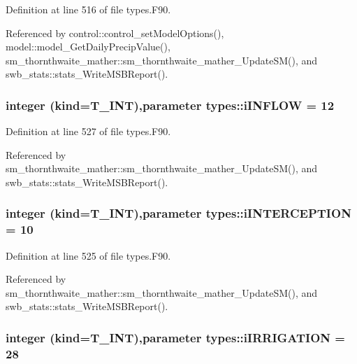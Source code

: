 Definition at line 516 of file types.F90.



Referenced by control::control\_\-setModelOptions(), model::model\_\-GetDailyPrecipValue(), sm\_\-thornthwaite\_\-mather::sm\_\-thornthwaite\_\-mather\_\-UpdateSM(), and swb\_\-stats::stats\_\-WriteMSBReport().

\hypertarget{namespacetypes_a76a571421076f0030f2ecf4ab852504d}{
\subsubsection[{iINFLOW}]{\setlength{\rightskip}{0pt plus 5cm}integer (kind={\bf T\_\-INT}),parameter {\bf types::iINFLOW} = 12}}
\label{namespacetypes_a76a571421076f0030f2ecf4ab852504d}


Definition at line 527 of file types.F90.



Referenced by sm\_\-thornthwaite\_\-mather::sm\_\-thornthwaite\_\-mather\_\-UpdateSM(), and swb\_\-stats::stats\_\-WriteMSBReport().

\hypertarget{namespacetypes_abbe2d030deced65481aa7f6447173269}{
\subsubsection[{iINTERCEPTION}]{\setlength{\rightskip}{0pt plus 5cm}integer (kind={\bf T\_\-INT}),parameter {\bf types::iINTERCEPTION} = 10}}
\label{namespacetypes_abbe2d030deced65481aa7f6447173269}


Definition at line 525 of file types.F90.



Referenced by sm\_\-thornthwaite\_\-mather::sm\_\-thornthwaite\_\-mather\_\-UpdateSM(), and swb\_\-stats::stats\_\-WriteMSBReport().

\hypertarget{namespacetypes_a8fc6acfd1e8720c1ee6432e0de5ceff0}{
\subsubsection[{iIRRIGATION}]{\setlength{\rightskip}{0pt plus 5cm}integer (kind={\bf T\_\-INT}),parameter {\bf types::iIRRIGATION} = 28}}
\label{namespacetypes_a8fc6acfd1e8720c1ee6432e0de5ceff0}


